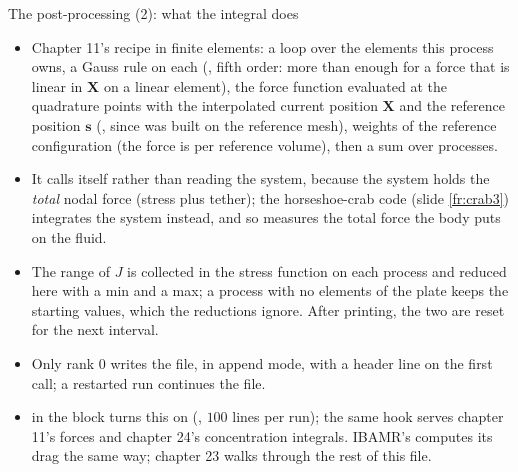 \documentclass[aspectratio=169,11pt]{beamer}
\begin{document}
\begin{frame}{The post-processing (2): what the integral does}
\label{fr:output2}
\footnotesize
\begin{itemize}
  \item Chapter 11's recipe in finite elements: a loop over the elements this process owns, a Gauss rule on each (, fifth order: more than enough for a force that is linear in $\mathbf{X}$ on a linear element), the force function evaluated at the quadrature points with the interpolated current position $\mathbf{X}$ and the reference position $\mathbf{s}$ (, since  was built on the reference mesh), weights  of the reference configuration (the force is per reference volume), then a sum over processes.
  \item It calls  itself rather than reading the  system, because the  system holds the \emph{total} nodal force (stress plus tether); the horseshoe-crab code (slide \ref{fr:crab3}) integrates the  system instead, and so measures the total force the body puts on the fluid.
  \item The range of $J$ is collected in the stress function on each process and reduced here with a min and a max; a process with no elements of the plate keeps the starting values, which the reductions ignore. After printing, the two are reset for the next interval.
  \item Only rank $0$ writes the file, in append mode, with a header line on the first call; a restarted run continues the file.
  \item {} in the  block turns this on (, $100$ lines per run); the same hook serves chapter 11's forces and chapter 24's concentration integrals. IBAMR's  computes its drag the same way; chapter 23 walks through the rest of this file.
\end{itemize}
\end{frame}
\end{document}
